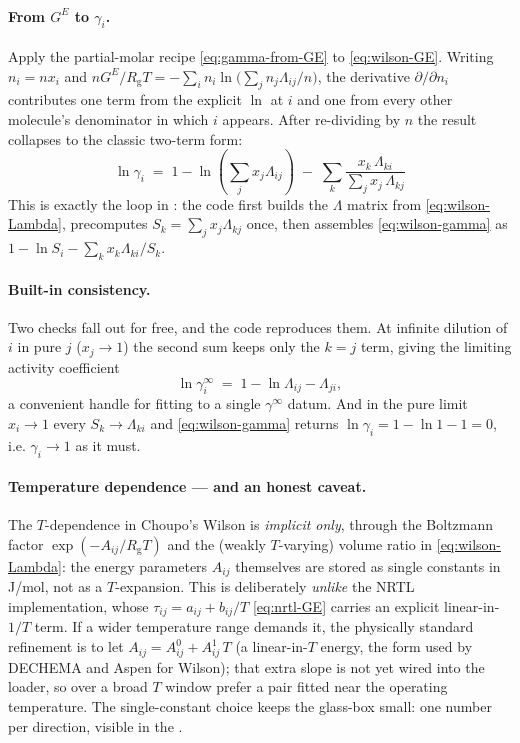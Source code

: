 \documentclass[11pt,a4paper]{article}
\newcommand{\Rgas}{R_{\!\mathrm{g}}}                %
\newcommand{\Gex}{G^{E}}
\begin{document}
\paragraph{From $\Gex$ to $\gamma_i$.}
Apply the partial-molar recipe \eqref{eq:gamma-from-GE} to
\eqref{eq:wilson-GE}. Writing $n_i = n x_i$ and
$n\Gex/\Rgas T = -\sum_i n_i \ln\!\big(\sum_j n_j\Lambda_{ij}/n\big)$,
the derivative $\partial/\partial n_i$ contributes one term from the
explicit $\ln$ at $i$ and one from every other molecule's denominator in
which $i$ appears. After re-dividing by $n$ the result collapses to the
classic two-term form:
\begin{equation}
   \boxed{\;
   \ln \gamma_i \;=\;
   1 - \ln\!\left(\sum_{j} x_j \Lambda_{ij}\right)
   \;-\;\sum_{k} \frac{x_k\, \Lambda_{ki}}
                      {\displaystyle\sum_{j} x_j\, \Lambda_{kj}}
   \;}
   \label{eq:wilson-gamma}
\end{equation}
This is exactly the loop in
: the code first builds
the $\Lambda$ matrix from \eqref{eq:wilson-Lambda}, precomputes
$S_k=\sum_j x_j\Lambda_{kj}$ once, then assembles
\eqref{eq:wilson-gamma} as $1-\ln S_i - \sum_k x_k\Lambda_{ki}/S_k$.

\paragraph{Built-in consistency.} Two checks fall out for free, and the
code reproduces them. At infinite dilution of $i$ in pure $j$
($x_j\to1$) the second sum keeps only the $k=j$ term, giving the
limiting activity coefficient
\begin{equation}
   \ln\gamma_i^{\infty} \;=\; 1 - \ln\Lambda_{ij} - \Lambda_{ji},
\end{equation}
a convenient handle for fitting to a single $\gamma^{\infty}$ datum. And
in the pure limit $x_i\to1$ every $S_k\to\Lambda_{ki}$ and
\eqref{eq:wilson-gamma} returns $\ln\gamma_i = 1 - \ln 1 - 1 = 0$, i.e.
$\gamma_i\to1$ as it must.

\paragraph{Temperature dependence --- and an honest caveat.}
The $T$-dependence in Choupo's Wilson is \emph{implicit only}, through
the Boltzmann factor $\exp(-A_{ij}/\Rgas T)$ and the (weakly
$T$-varying) volume ratio in \eqref{eq:wilson-Lambda}: the energy
parameters $A_{ij}$ themselves are stored as single constants in J/mol,
not as a $T$-expansion. This is deliberately \emph{unlike} the NRTL
implementation, whose $\tau_{ij}=a_{ij}+b_{ij}/T$
\eqref{eq:nrtl-GE} carries an explicit linear-in-$1/T$ term. If a wider
temperature range demands it, the physically standard refinement is to
let $A_{ij}=A_{ij}^{0}+A_{ij}^{1}\,T$ (a linear-in-$T$ energy, the form
used by DECHEMA and Aspen for Wilson); that extra slope is not yet wired
into the loader, so over a broad $T$ window prefer a pair fitted near the
operating temperature. The single-constant choice keeps the glass-box
small: one number per direction, visible in the .
\end{document}
